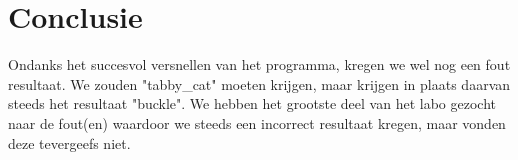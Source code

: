 \documentclass[a4paper, 12pt, one column]{article}
\begin{document}
\section{Conclusie}
Ondanks het succesvol versnellen van het programma, kregen we wel nog een fout resultaat.
We zouden "tabby\_cat" moeten krijgen, maar krijgen in plaats daarvan steeds het resultaat "buckle". We hebben het grootste deel
van het labo gezocht naar de fout(en) waardoor we steeds een incorrect resultaat kregen, maar vonden deze tevergeefs niet.


\end{document}
